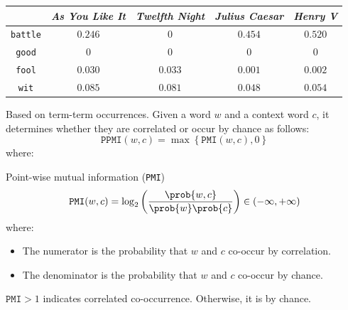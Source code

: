 \begin{description}
\begin{description}
\begin{example}
\begin{table}[H]
                        \centering
                        \footnotesize
                        \begin{tabular}{ccccc}
                            \toprule
                            & \textit{As You Like It} & \textit{Twelfth Night} & \textit{Julius Caesar} & \textit{Henry V} \\
                            \midrule
                            \texttt{battle} & $0.246$ & 0 & $0.454$ & $0.520$ \\
                            \texttt{good} & 0 & 0 & 0 & 0 \\
                            \texttt{fool} & $0.030$ & $0.033$ & $0.001$ & $0.002$ \\
                            \texttt{wit} & $0.085$ & $0.081$ & $0.048$ & $0.054$ \\
                            \bottomrule
                        \end{tabular}
                    \end{table}
                \end{example}

            \item[Positive point-wise mutual information (PPMI)] 
                Based on term-term occurrences. Given a word $w$ and a context word $c$, it determines whether they are correlated or occur by chance as follows:
                \[ \texttt{PPMI}(w, c) = \max\left\{ \texttt{PMI}(w, c), 0 \right\} \]
                where:
                \begin{descriptionlist}
                    \item[Point-wise mutual information (\texttt{PMI})]
                    \[ \texttt{PMI}(w, c) = \log_2\left( \frac{\prob{w, c}}{\prob{w}\prob{c}} \right) \in (-\infty, +\infty) \]
                    where:
                    \begin{itemize}
                        \item The numerator is the probability that $w$ and $c$ co-occur by correlation.
                        \item The denominator is the probability that $w$ and $c$ co-occur by chance.
                    \end{itemize} 

                    \begin{remark}
                        $\texttt{PMI} > 1$ indicates correlated co-occurrence. Otherwise, it is by chance.
                    \end{remark}
                \end{descriptionlist}


\end{description}
\end{description}
